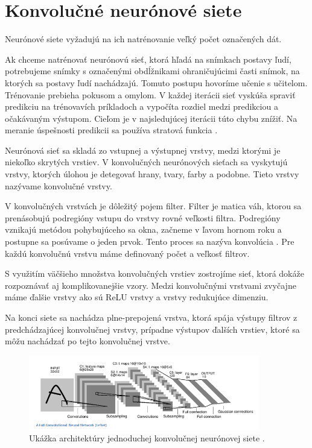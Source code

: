 \section{Konvolučné neurónové siete}
Neurónové siete vyžadujú na ich natrénovanie veľký počet označených dát.

Ak chceme natrénovať neurónovú sieť, ktorá hľadá na snímkach postavy ľudí, potrebujeme snímky s označenými obdĺžnikami ohraničujúcimi časti snímok, na ktorých sa postavy ľudí nachádzajú.
Tomuto postupu hovoríme učenie s učitelom.
Trénovanie prebieha pokusom a omylom. 
V každej iterácii sieť vyskúša spraviť predikciu na trénovavích príkladoch a vypočíta rozdiel medzi predikciou a očakávaným výstupom.
Cieľom je v najsledujúcej iterácii túto chybu znížiť.
Na meranie úspešnosti predikcii sa používa stratová funkcia \cite{cnn1}.

Neurónová sieť sa skladá zo vstupnej a výstupnej vrstvy, medzi ktorými je niekoľko skrytých vrstiev.
V konvolučných neurónových sieťach sa vyskytujú vrstvy, ktorých úlohou je detegovať hrany, tvary, farby a podobne.
Tieto vrstvy nazývame konvolučné vrstvy.

V konvolučných vrstvách je dôležitý pojem filter.
Filter je matica váh, ktorou sa prenásobujú podregióny vstupu do vrstvy rovné veľkosti filtra.
Podregióny vznikajú metódou pohybujúceho sa okna, začneme v ľavom hornom roku a postupne sa posúvame o jeden prvok.
Tento proces sa nazýva konvolúcia \cite{cnn2}. 
Pre každú konvolučnú vrstvu máme definovaný počet a veľkosť filtrov.

S využitím väčšieho množstva konvolučných vrstiev zostrojíme sieť, ktorá dokáže rozpoznávať aj komplikovanejšie vzory.
Medzi konvolučnými vrstvami zvyčajne máme ďalšie vrstvy ako sú ReLU vrstvy a vrstvy redukujúce dimenziu.

Na konci siete sa nachádza plne-prepojená vrstva, ktorá spája výstupy filtrov z predchádzajúcej konvolučnej vrstvy, prípadne výstupov ďalších vrstiev, ktoré sa môžu nachádzať po tejto konvolučnej vrstve.

\begin{figure}[H]
\centerline{\includegraphics[width=0.9\textwidth]{images/conv}}
\caption[Konvolučná neurónová sieť]{Ukážka architektúry jednoduchej konvolučnej neurónovej siete \cite{cnn2}.}
\label{obr:conv}
\end{figure}

